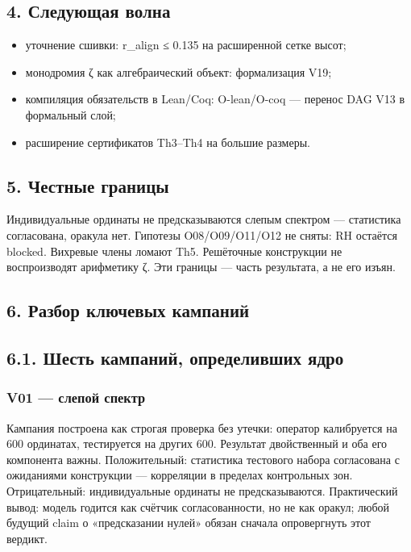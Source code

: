\documentclass[11pt,a4paper]{article}
\begin{document}
\subsection{4. Следующая волна}

\begin{itemize}
  \item уточнение сшивки: r\_align ≤ 0.135 на расширенной сетке высот;
  \item монодромия ζ как алгебраический объект: формализация V19;
  \item компиляция обязательств в Lean/Coq: O-lean/O-coq — перенос DAG V13 в формальный слой;
  \item расширение сертификатов Th3–Th4 на большие размеры.
\end{itemize}

\subsection{5. Честные границы}

Индивидуальные ординаты не предсказываются слепым спектром — статистика согласована, оракула нет. Гипотезы O08/O09/O11/O12 не сняты: RH остаётся blocked. Вихревые члены ломают Th5. Решёточные конструкции не воспроизводят арифметику ζ. Эти границы — часть результата, а не его изъян.

\subsection{6. Разбор ключевых кампаний}

\subsection{6.1. Шесть кампаний, определивших ядро}

\subsubsection{V01 — слепой спектр}

Кампания построена как строгая проверка без утечки: оператор калибруется на 600 ординатах, тестируется на других 600. Результат двойственный и оба его компонента важны. Положительный: статистика тестового набора согласована с ожиданиями конструкции — корреляции в пределах контрольных зон. Отрицательный: индивидуальные ординаты не предсказываются. Практический вывод: модель годится как счётчик согласованности, но не как оракул; любой будущий claim о «предсказании нулей» обязан сначала опровергнуть этот вердикт.
\end{document}

